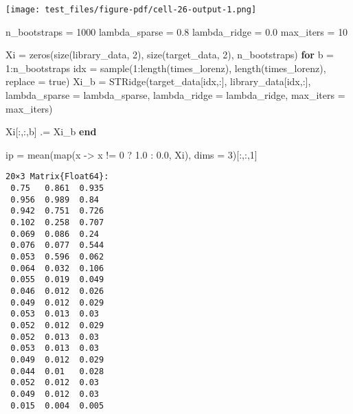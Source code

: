 \documentclass[
]{article}
\newenvironment{Shaded}{\begin{snugshade}}{\end{snugshade}}
\newcommand{\ConstantTok}[1]{\textcolor[rgb]{0.56,0.35,0.01}{#1}}
\newcommand{\ControlFlowTok}[1]{\textcolor[rgb]{0.00,0.23,0.31}{\textbf{#1}}}
\newcommand{\FloatTok}[1]{\textcolor[rgb]{0.68,0.00,0.00}{#1}}
\newcommand{\FunctionTok}[1]{\textcolor[rgb]{0.28,0.35,0.67}{#1}}
\newcommand{\NormalTok}[1]{\textcolor[rgb]{0.00,0.23,0.31}{#1}}
\newcommand{\OperatorTok}[1]{\textcolor[rgb]{0.37,0.37,0.37}{#1}}
\begin{document}
\texttt{[image: test\_files/figure-pdf/cell-26-output-1.png]}

\begin{Shaded}
\begin{Highlighting}[]
\NormalTok{n\_bootstraps }\OperatorTok{=} \FloatTok{1000}
\NormalTok{lambda\_sparse }\OperatorTok{=} \FloatTok{0.8}
\NormalTok{lambda\_ridge }\OperatorTok{=} \FloatTok{0.0}
\NormalTok{max\_iters }\OperatorTok{=} \FloatTok{10}

\NormalTok{Xi }\OperatorTok{=} \FunctionTok{zeros}\NormalTok{(}\FunctionTok{size}\NormalTok{(library\_data, }\FloatTok{2}\NormalTok{), }\FunctionTok{size}\NormalTok{(target\_data, }\FloatTok{2}\NormalTok{), n\_bootstraps)}
\ControlFlowTok{for}\NormalTok{ b }\OperatorTok{=} \FloatTok{1}\OperatorTok{:}\NormalTok{n\_bootstraps}
\NormalTok{    idx }\OperatorTok{=} \FunctionTok{sample}\NormalTok{(}\FloatTok{1}\OperatorTok{:}\FunctionTok{length}\NormalTok{(times\_lorenz), }\FunctionTok{length}\NormalTok{(times\_lorenz), replace }\OperatorTok{=} \ConstantTok{true}\NormalTok{)}
\NormalTok{    Xi\_b }\OperatorTok{=} \FunctionTok{STRidge}\NormalTok{(target\_data[idx,}\OperatorTok{:}\NormalTok{], library\_data[idx,}\OperatorTok{:}\NormalTok{], }
\NormalTok{        lambda\_sparse }\OperatorTok{=}\NormalTok{ lambda\_sparse,}
\NormalTok{        lambda\_ridge }\OperatorTok{=}\NormalTok{ lambda\_ridge,}
\NormalTok{        max\_iters }\OperatorTok{=}\NormalTok{ max\_iters)}

\NormalTok{    Xi[}\OperatorTok{:}\NormalTok{,}\OperatorTok{:}\NormalTok{,b] }\OperatorTok{.=}\NormalTok{ Xi\_b}
\ControlFlowTok{end}

\NormalTok{ip }\OperatorTok{=} \FunctionTok{mean}\NormalTok{(}\FunctionTok{map}\NormalTok{(x }\OperatorTok{{-}\textgreater{}}\NormalTok{ x }\OperatorTok{!=} \FloatTok{0}\NormalTok{ ? }\FloatTok{1.0} \OperatorTok{:} \FloatTok{0.0}\NormalTok{, Xi), dims }\OperatorTok{=} \FloatTok{3}\NormalTok{)[}\OperatorTok{:}\NormalTok{,}\OperatorTok{:}\NormalTok{,}\FloatTok{1}\NormalTok{]}
\end{Highlighting}
\end{Shaded}

\begin{verbatim}
20×3 Matrix{Float64}:
 0.75   0.861  0.935
 0.956  0.989  0.84
 0.942  0.751  0.726
 0.102  0.258  0.707
 0.069  0.086  0.24
 0.076  0.077  0.544
 0.053  0.596  0.062
 0.064  0.032  0.106
 0.055  0.019  0.049
 0.046  0.012  0.026
 0.049  0.012  0.029
 0.053  0.013  0.03
 0.052  0.012  0.029
 0.052  0.013  0.03
 0.053  0.013  0.03
 0.049  0.012  0.029
 0.044  0.01   0.028
 0.052  0.012  0.03
 0.049  0.012  0.03
 0.015  0.004  0.005
\end{verbatim}
\end{document}
